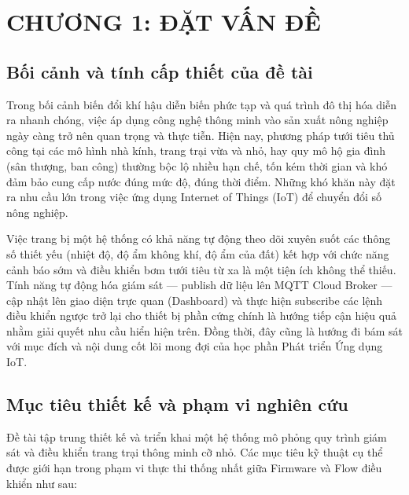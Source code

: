 \documentclass[12pt, a4paper]{article}
\begin{document}
\thispagestyle{fancy}
\fontsize{13}{19.5}\selectfont

\section*{CHƯƠNG 1: ĐẶT VẤN ĐỀ}
{}
\label{sec:ch1}
\setcounter{section}{1}
\setcounter{subsection}{0}

\subsection{Bối cảnh và tính cấp thiết của đề tài}
Trong bối cảnh biến đổi khí hậu diễn biến phức tạp và quá trình đô thị hóa diễn ra nhanh chóng, việc áp dụng công nghệ thông minh vào sản xuất nông nghiệp ngày càng trở nên quan trọng và thực tiễn. Hiện nay, phương pháp tưới tiêu thủ công tại các mô hình nhà kính, trang trại vừa và nhỏ, hay quy mô hộ gia đình (sân thượng, ban công) thường bộc lộ nhiều hạn chế, tốn kém thời gian và khó đảm bảo cung cấp nước đúng mức độ, đúng thời điểm. Những khó khăn này đặt ra nhu cầu lớn trong việc ứng dụng Internet of Things (IoT) để chuyển đổi số nông nghiệp. 

Việc trang bị một hệ thống có khả năng tự động theo dõi xuyên suốt các thông số thiết yếu (nhiệt độ, độ ẩm không khí, độ ẩm của đất) kết hợp với chức năng cảnh báo sớm và điều khiển bơm tưới tiêu từ xa là một tiện ích không thể thiếu. Tính năng tự động hóa giám sát — publish dữ liệu lên MQTT Cloud Broker — cập nhật lên giao diện trực quan (Dashboard) và thực hiện subscribe các lệnh điều khiển ngược trở lại cho thiết bị phần cứng chính là hướng tiếp cận hiệu quả nhằm giải quyết nhu cầu hiển hiện trên. Đồng thời, đây cũng là hướng đi bám sát với mục đích và nội dung cốt lõi mong đợi của học phần Phát triển Ứng dụng IoT.

\subsection{Mục tiêu thiết kế và phạm vi nghiên cứu}
Đề tài tập trung thiết kế và triển khai một hệ thống mô phỏng quy trình giám sát và điều khiển trang trại thông minh cỡ nhỏ. Các mục tiêu kỹ thuật cụ thể được giới hạn trong phạm vi thực thi thống nhất giữa Firmware và Flow điều khiển như sau:
\end{document}
